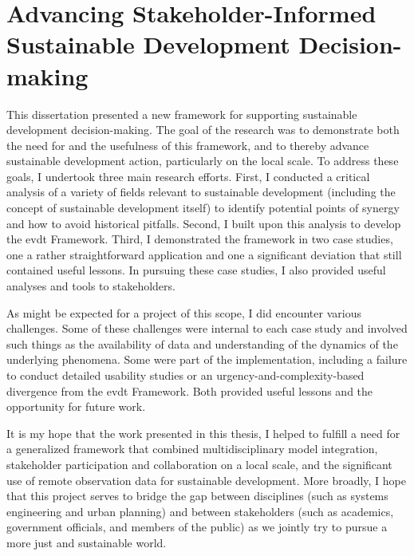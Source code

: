 \section{Advancing Stakeholder-Informed Sustainable Development Decision-making}

This dissertation presented a new framework for supporting sustainable development decision-making. The goal of the research was to demonstrate both the need for and the usefulness of this framework, and to thereby advance sustainable development action, particularly on the local scale. To address these goals, I undertook three main research efforts. First, I conducted a critical analysis of a variety of fields relevant to sustainable development (including the concept of sustainable development itself) to identify potential points of synergy and how to avoid historical pitfalls. Second, I built upon this analysis to develop the \acf{evdt} Framework. Third, I demonstrated the framework in two case studies, one a rather straightforward application and one a significant deviation that still contained useful lessons. In pursuing these case studies, I also provided useful analyses and tools to stakeholders.

As might be expected for a project of this scope, I did encounter various challenges. Some of these challenges were internal to each case study and involved such things as the availability of data and understanding of the dynamics of the underlying phenomena. Some were part of the implementation, including a failure to conduct detailed usability studies or an urgency-and-complexity-based divergence from the \ac{evdt} Framework. Both provided useful lessons and the opportunity for future work.

It is my hope that the work presented in this thesis, I helped to fulfill a need for a generalized framework that combined multidisciplinary model integration, stakeholder participation and collaboration on a local scale, and the significant use of remote observation data for sustainable development. More broadly, I hope that this project serves to bridge the gap between disciplines (such as systems engineering and urban planning) and between stakeholders (such as academics, government officials, and members of the public) as we jointly try to pursue a more just and sustainable world.


